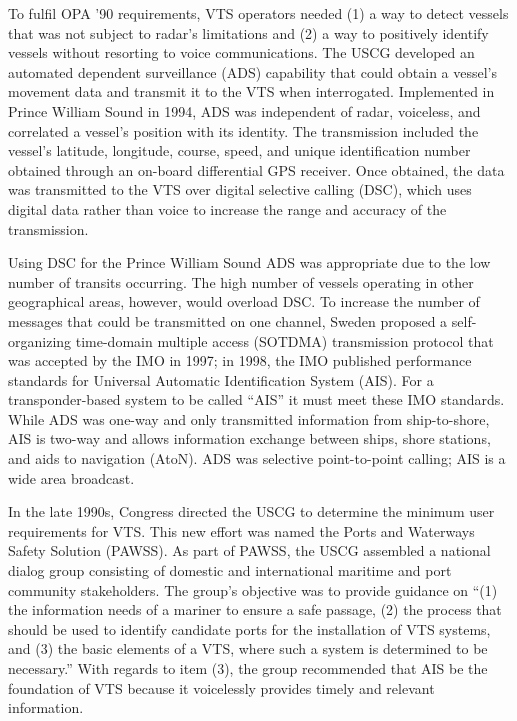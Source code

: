 \documentclass[twoside,symmetric,notoc]{tufte-book}
\begin{document}
\par{%
To fulfil OPA '90 requirements, VTS operators needed (1) a way to detect vessels that was not subject to radar's limitations and (2) a way to positively identify vessels without resorting to voice communications. The USCG developed an automated dependent surveillance (ADS) capability that could obtain a vessel's movement data and transmit it to the VTS when interrogated. Implemented in Prince William Sound in 1994, ADS was independent of radar, voiceless, and correlated a vessel's position with its identity. The transmission included the vessel's latitude, longitude, course, speed, and unique identification number obtained through an on-board differential GPS receiver. Once obtained, the data was transmitted to the VTS over digital selective calling (DSC), which uses digital data rather than voice to increase the range and accuracy of the transmission.\cite[-0.7in]{Radice}\cite{Harre}
}
\par{%
Using DSC for the Prince William Sound ADS was appropriate due to the low number of transits occurring. The high number of vessels operating in other geographical areas, however, would overload DSC.\cite{Johnson} To increase the number of messages that could be transmitted on one channel, Sweden proposed a self-organizing time-domain multiple access (SOTDMA) transmission protocol that was accepted by the IMO in 1997; in 1998, the IMO published performance standards for Universal Automatic Identification System (AIS).\cite[-0.5in]{Norris} For a transponder-based system to be called ``AIS'' it must meet these IMO standards.\cite[-0.2in]{TRB} While ADS was one-way and only transmitted information from ship-to-shore, AIS is two-way and allows information exchange between ships, shore stations, and aids to navigation (AtoN). ADS was selective point-to-point calling; AIS is a wide area broadcast.
}
\par{%
In the late 1990s, Congress directed the USCG to determine the minimum user requirements for VTS.\cite{House} This new effort was named the Ports and Waterways Safety Solution (PAWSS). As part of PAWSS, the USCG assembled a national dialog group consisting of domestic and international maritime and port community stakeholders. The group's objective was to provide guidance on ``(1) the information needs of a mariner to ensure a safe passage, (2) the process that should be used to identify candidate ports for the installation of VTS systems, and (3) the basic elements of a VTS, where such a system is determined to be necessary.''\cite{Marine_Board} With regards to item (3), the group recommended that AIS be the foundation of VTS because it voicelessly provides timely and relevant information.\cite{GAO_2009}
}
\end{document}
